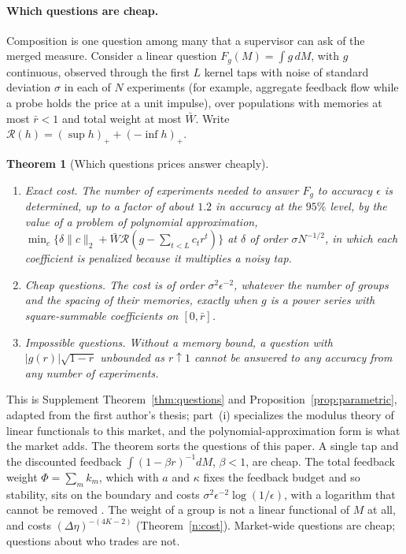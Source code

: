 \documentclass[12pt]{article}
\newtheorem{theorem}{Theorem}[section]
\theoremstyle{definition}
\theoremstyle{remark}
\begin{document}
\paragraph{Which questions are cheap.} Composition is one question among many that a supervisor can ask of the merged measure. Consider a linear question $F_g(M)=\int g\,dM$, with $g$ continuous, observed through the first $L$ kernel taps with noise of standard deviation $\sigma$ in each of $N$ experiments (for example, aggregate feedback flow while a probe holds the price at a unit impulse), over populations with memories at most $\bar r<1$ and total weight at most $\bar W$. Write $\mathcal R(h)=(\sup h)_++(-\inf h)_+$.

\begin{theorem}[Which questions prices answer cheaply]\label{n:questions}
\begin{enumerate}[label=(\roman*),itemsep=1pt]
\item \emph{Exact cost.} The number of experiments needed to answer $F_g$ to accuracy $\epsilon$ is determined, up to a factor of about $1.2$ in accuracy at the $95\%$ level, by the value of a problem of polynomial approximation, $\min_c\{\delta\|c\|_2+\bar W\mathcal R(g-\sum_{t<L}c_tr^t)\}$ at $\delta$ of order $\sigma N^{-1/2}$, in which each coefficient is penalized because it multiplies a noisy tap.
\item \emph{Cheap questions.} The cost is of order $\sigma^2\epsilon^{-2}$, whatever the number of groups and the spacing of their memories, exactly when $g$ is a power series with square-summable coefficients on $[0,\bar r]$.
\item \emph{Impossible questions.} Without a memory bound, a question with $|g(r)|\sqrt{1-r}$ unbounded as $r\uparrow1$ cannot be answered to any accuracy from any number of experiments.
\end{enumerate}
\end{theorem}

This is Supplement Theorem~\ref{thm:questions} and Proposition~\ref{prop:parametric}, adapted from the first author's thesis; part~(i) specializes the modulus theory of linear functionals \citep{donoho1994} to this market, and the polynomial-approximation form is what the market adds. The theorem sorts the questions of this paper. A single tap and the discounted feedback $\int(1-\beta r)^{-1}dM$, $\beta<1$, are cheap. The total feedback weight $\Phi=\sum_mk_m$, which with $a$ and $\kappa$ fixes the feedback budget and so stability, sits on the boundary and costs $\sigma^2\epsilon^{-2}\log(1/\epsilon)$, with a logarithm that cannot be removed \citep{niroula2026b}. The weight of a group is not a linear functional of $M$ at all, and costs $(\Delta\eta)^{-(4K-2)}$ (Theorem~\ref{n:cost}). Market-wide questions are cheap; questions about who trades are not.
\end{document}
